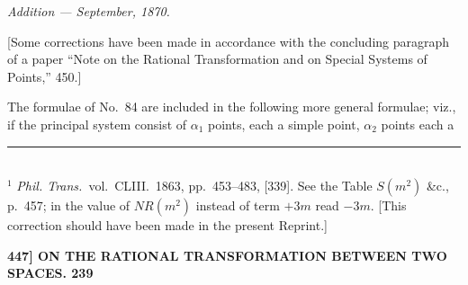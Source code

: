 \documentclass[11pt]{article}
\begin{document}
\medskip
\begin{center}\textit{Addition --- September, 1870.}\end{center}

[Some corrections have been made in accordance with the concluding paragraph of a
paper ``Note on the Rational Transformation and on Special Systems of Points,'' 450.]

The formulae of No.~84 are included in the following more general formulae; viz.,
if the principal system consist of $\alpha_1$ points, each a simple point, $\alpha_2$ points each a

\vfill
\noindent\rule{2cm}{0.4pt}\\
\footnotesize $^{1}$ \textit{Phil. Trans.}\ vol.\ CLIII.\ 1863, pp.~453--483, [339]. See the Table $S(m^2)$ \&c., p.~457; in the value of $NR(m^2)$ instead of term $+3m$ read $-3m$. [This correction should have been made in the present Reprint.]
\normalsize

\medskip
\noindent\textbf{447] \quad ON THE RATIONAL TRANSFORMATION BETWEEN TWO SPACES. \hfill 239}

\medskip
\end{document}
